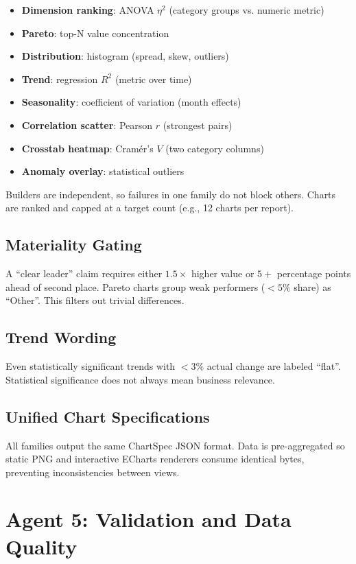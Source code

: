 \documentclass[12pt,a4paper,openany]{report}
\begin{document}
\begin{itemize}
	\item \textbf{Dimension ranking}: ANOVA $\eta^2$ (category groups vs. numeric metric)
	\item \textbf{Pareto}: top-N value concentration
	\item \textbf{Distribution}: histogram (spread, skew, outliers)
	\item \textbf{Trend}: regression $R^2$ (metric over time)
	\item \textbf{Seasonality}: coefficient of variation (month effects)
	\item \textbf{Correlation scatter}: Pearson $r$ (strongest pairs)
	\item \textbf{Crosstab heatmap}: Cramér's $V$ (two category columns)
	\item \textbf{Anomaly overlay}: statistical outliers
\end{itemize}

Builders are independent, so failures in one family do not block others. Charts are ranked and capped at a target count (e.g., 12 charts per report).

\subsection{Materiality Gating}

A ``clear leader'' claim requires either $1.5\times$ higher value or $5+$ percentage points ahead of second place. Pareto charts group weak performers ($<5\%$ share) as ``Other''. This filters out trivial differences.

\subsection{Trend Wording}

Even statistically significant trends with $<3\%$ actual change are labeled ``flat''. Statistical significance does not always mean business relevance.

\subsection{Unified Chart Specifications}

All families output the same ChartSpec JSON format. Data is pre-aggregated so static PNG and interactive ECharts renderers consume identical bytes, preventing inconsistencies between views.

\section{Agent 5: Validation and Data Quality}
\end{document}
